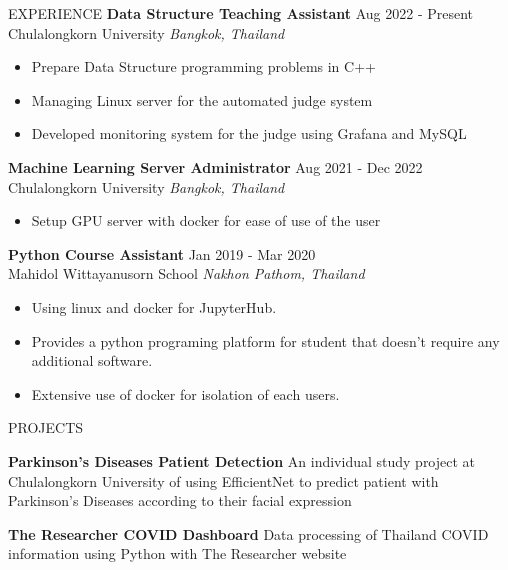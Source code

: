 \documentclass{resume} %
\begin{document}
\begin{rSection}{EXPERIENCE}
    \textbf{Data Structure Teaching Assistant} \hfill Aug 2022 - Present\\
    Chulalongkorn University \hfill \textit{Bangkok, Thailand}
    \begin{itemize}
        \itemsep -3pt {}
        \item Prepare Data Structure programming problems in C++
        \item Managing Linux server for the automated judge system
        \item Developed monitoring system for the judge using Grafana and MySQL
    \end{itemize}
    \textbf{Machine Learning Server Administrator} \hfill Aug 2021 - Dec 2022\\
    Chulalongkorn University \hfill \textit{Bangkok, Thailand}
    \begin{itemize}
        \itemsep -3pt {}
        \item Setup GPU server with docker for ease of use of the user
    \end{itemize}
    \textbf{Python Course Assistant} \hfill Jan 2019 - Mar 2020\\
    Mahidol Wittayanusorn School \hfill \textit{Nakhon Pathom, Thailand}
    \begin{itemize}
        \itemsep -3pt {}
        \item Using linux and docker for JupyterHub.
        \item Provides a python programing platform for student that doesn't require any additional software.
        \item Extensive use of docker for isolation of each users.
    \end{itemize}

\end{rSection}


\begin{rSection}{PROJECTS}
    \vspace{-1.25em}
    \item \textbf{Parkinson's Diseases Patient Detection} {An individual study project at Chulalongkorn University of using EfficientNet to predict patient with Parkinson's Diseases according to their facial expression}
    \item \textbf{The Researcher COVID Dashboard} {Data processing of Thailand COVID information using Python with The Researcher website}
\end{rSection}
\end{document}
